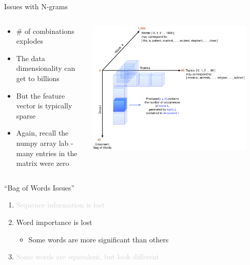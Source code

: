 \documentclass[aspectratio=169]{beamer}
\begin{document}
\begin{frame}{Issues with N-grams}

\begin{columns}
\begin{column}{0.5\textwidth}
\begin{itemize}
\item \# of combinations explodes
\item The data dimensionality can get to billions
\item But the feature vector is typically sparse
\item Again, recall the numpy array lab - many entries in the matrix were zero
\end{itemize}
\end{column}
\begin{column}{0.5\textwidth}
    \includegraphics[width=0.9\textwidth]{lectSup/3D.pdf}
\end{column}
\end{columns}
\end{frame}
\begin{frame}{``Bag of Words Issues''}

\begin{enumerate}
\item \textcolor{lightgray}{ Sequence information is lost}
\item Word importance is lost
\begin{itemize}
\item Some words are more significant than others
\end{itemize}
\item \textcolor{lightgray}{ Some words are equivalent, but look different}
\end{enumerate}
\end{frame}
\end{document}
